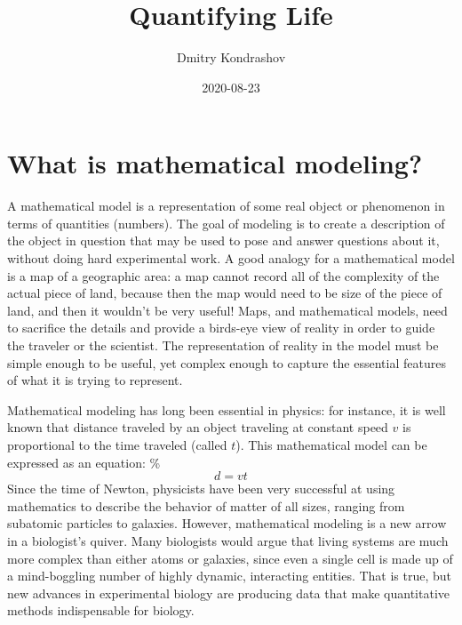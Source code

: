 \documentclass[
]{book}
\title{Quantifying Life}
\author{Dmitry Kondrashov}
\date{2020-08-23}
\begin{document}
\maketitle

{
\setcounter{tocdepth}{1}
\tableofcontents
}
\hypertarget{what-is-mathematical-modeling}{%
\chapter{What is mathematical modeling?}\label{what-is-mathematical-modeling}}

A mathematical model  is a representation of some real object or phenomenon in terms of quantities (numbers). The goal of modeling is to create a description of the object in question that may be used to pose and answer questions about it, without doing hard experimental work. A good analogy for a mathematical model is a map of a geographic area: a map cannot record all of the complexity of the actual piece of land, because then the map would need to be size of the piece of land, and then it wouldn't be very useful! Maps, and mathematical models, need to sacrifice the details and provide a birds-eye view of reality in order to guide the traveler or the scientist. The representation of reality in the model must be simple enough to be useful, yet complex enough to capture the essential features of what it is trying to represent.

Mathematical modeling has long been essential in physics: for instance, it is well known that distance traveled by an object traveling at constant speed \(v\) is proportional to the time traveled (called \(t\)). This mathematical model can be expressed as an equation:
\%\[d = vt\]
Since the time of Newton, physicists have been very successful at using mathematics to describe the behavior of matter of all sizes, ranging from subatomic particles to galaxies. However, mathematical modeling is a new arrow in a biologist's quiver. Many biologists would argue that living systems are much more complex than either atoms or galaxies, since even a single cell is made up of a mind-boggling number of highly dynamic, interacting entities. That is true, but new advances in experimental biology are producing data that make quantitative methods indispensable for biology.
\end{document}

